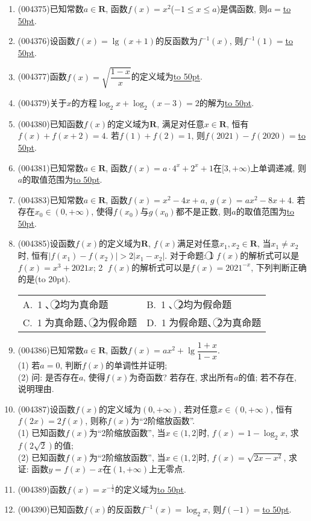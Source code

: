 \documentclass[10pt,a4paper]{article}
\newcommand{\blank}[1]{\underline{\hbox to #1pt{}}}
\newcommand{\bracket}[1]{(\hbox to #1pt{})}
\newcommand{\twoch}[4]{\par\begin{tabular}{p{.46\textwidth}p{.46\textwidth}}
A.~#1& B.~#2\\
C.~#3& D.~#4
\end{tabular}}
\begin{document}
\begin{enumerate}[1.]
\item {\tiny (004375)}已知常数$a\in \mathbf{R}$, 函数$f(x)=x^2$($-1\le x\le a$)是偶函数, 则$a=$\blank{50}.
\item {\tiny (004376)}设函数$f(x)=\lg (x+1)$的反函数为$f^{-1}(x)$, 则$f^{-1}(1)=$\blank{50}.
\item {\tiny (004377)}函数$f(x)=\sqrt{\dfrac{1-x}x}$的定义域为\blank{50}.
\item {\tiny (004379)}关于$x$的方程$\log_2 x+\log_2(x-3)=2$的解为\blank{50}.
\item {\tiny (004380)}已知函数$f(x)$的定义域为$\mathbf{R}$, 满足对任意$x\in \mathbf{R}$, 恒有$f(x)+f(x+2)=4$. 若$f(1)+f(2)=1$, 则$f(2021)-f(2020)=$\blank{50}.
\item {\tiny (004381)}已知常数$a\in \mathbf{R}$, 函数$f(x)=a\cdot 4^x+2^x+1$在$[3,+\infty)$上单调递减, 则$a$的取值范围为\blank{50}.
\item {\tiny (004383)}已知常数$a\in \mathbf{R}$, 函数$f(x)=x^2-4x+a$, $g(x)=ax^2-8x+4$. 若存在$x_0\in (0,+\infty)$, 使得$f(x_0)$与$g(x_0)$都不是正数, 则$a$的取值范围为\blank{50}.
\item {\tiny (004385)}设函数$f(x)$的定义域为$\mathbf{R}$, $f(x)$满足对任意$x_1,x_2\in \mathbf{R}$, 当$x_1\ne x_2$时, 恒有$|f(x_1)-f(x_2)|>2|x_1-x_2|$. 对于命题: \textcircled{1} $f(x)$的解析式可以是$f(x)=x^3+2021x$; \textcircled{2} $f(x)$的解析式可以是$f(x)=2021^{-x}$, 下列判断正确的是\bracket{20}.
\twoch{\textcircled{1}、\textcircled{2}均为真命题}{\textcircled{1}、\textcircled{2}均为假命题}{\textcircled{1}为真命题、\textcircled{2}为假命题}{\textcircled{1}为假命题、\textcircled{2}为真命题}
\item {\tiny (004386)}已知常数$a\in \mathbf{R}$, 函数$f(x)=ax^2+\lg \dfrac{1+x}{1-x}$.\\
(1) 若$a=0$, 判断$f(x)$的单调性并证明;\\
(2) 问: 是否存在$a$, 使得$f(x)$为奇函数? 若存在, 求出所有$a$的值; 若不存在, 说明理由.
\item {\tiny (004387)}设函数$f(x)$的定义域为$(0,+\infty)$, 若对任意$x\in (0,+\infty)$, 恒有$f(2x)=2f(x)$, 则称$f(x)$为``$2$阶缩放函数''.\\
(1) 已知函数$f(x)$为``$2$阶缩放函数'', 当$x\in (1,2]$时, $f(x)=1-\log_2 x$, 求$f(2\sqrt{2})$的值;\\
(2) 已知函数$f(x)$为``$2$阶缩放函数'', 当$x\in (1,2]$时, $f(x)=\sqrt{2x-x^2}$, 求证: 函数$y=f(x)-x$在$(1,+\infty)$上无零点.
\item {\tiny (004389)}函数$f(x)=x^{- \frac 12}$的定义域为\blank{50}.
\item {\tiny (004390)}已知函数$f(x)$的反函数$f^{-1}(x)=\log_2x$, 则$f(-1)=$\blank{50}.

\end{enumerate}
\end{document}
